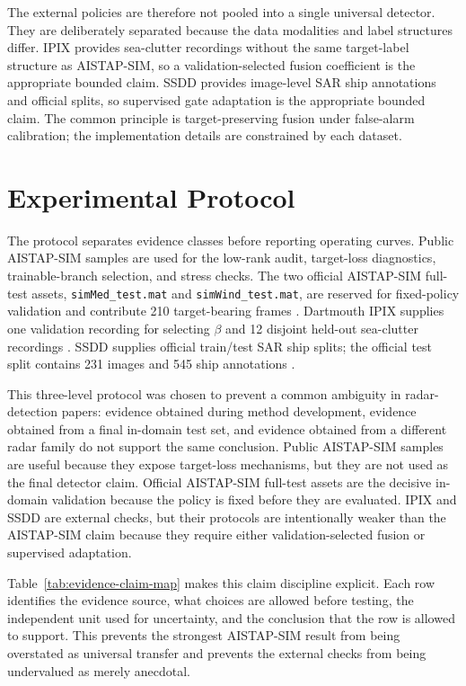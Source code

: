 \documentclass[journal]{IEEEtran}
\begin{document}
The external policies are therefore not pooled into a single universal detector. They are deliberately separated because the data modalities and label structures differ. IPIX provides sea-clutter recordings without the same target-label structure as AISTAP-SIM, so a validation-selected fusion coefficient is the appropriate bounded claim. SSDD provides image-level SAR ship annotations and official splits, so supervised gate adaptation is the appropriate bounded claim. The common principle is target-preserving fusion under false-alarm calibration; the implementation details are constrained by each dataset.

\section{Experimental Protocol}

The protocol separates evidence classes before reporting operating curves. Public AISTAP-SIM samples are used for the low-rank audit, target-loss diagnostics, trainable-branch selection, and stress checks. The two official AISTAP-SIM full-test assets, \texttt{simMed\_test.mat} and \texttt{simWind\_test.mat}, are reserved for fixed-policy validation and contribute 210 target-bearing frames \cite{vega2024aistap}. Dartmouth IPIX supplies one validation recording for selecting $\beta$ and 12 disjoint held-out sea-clutter recordings \cite{haykin2002seaclutter,dewind2010database}. SSDD supplies official train/test SAR ship splits; the official test split contains 231 images and 545 ship annotations \cite{wang2019ssdd,zhang2021ssdd}.

This three-level protocol was chosen to prevent a common ambiguity in radar-detection papers: evidence obtained during method development, evidence obtained from a final in-domain test set, and evidence obtained from a different radar family do not support the same conclusion. Public AISTAP-SIM samples are useful because they expose target-loss mechanisms, but they are not used as the final detector claim. Official AISTAP-SIM full-test assets are the decisive in-domain validation because the policy is fixed before they are evaluated. IPIX and SSDD are external checks, but their protocols are intentionally weaker than the AISTAP-SIM claim because they require either validation-selected fusion or supervised adaptation.

Table~\ref{tab:evidence-claim-map} makes this claim discipline explicit. Each row identifies the evidence source, what choices are allowed before testing, the independent unit used for uncertainty, and the conclusion that the row is allowed to support. This prevents the strongest AISTAP-SIM result from being overstated as universal transfer and prevents the external checks from being undervalued as merely anecdotal.
\end{document}
